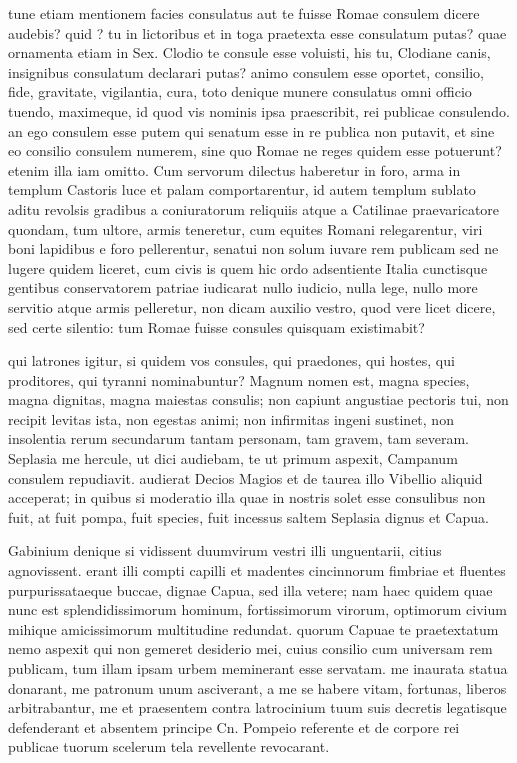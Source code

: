  tune etiam mentionem facies consulatus aut te fuisse Romae consulem dicere audebis? quid ? tu in lictoribus et in toga praetexta esse consulatum putas? quae ornamenta etiam in Sex. Clodio te consule esse voluisti, his tu, Clodiane canis, insignibus consulatum declarari putas? animo consulem esse oportet, consilio, fide, gravitate, vigilantia, cura, toto denique munere consulatus omni officio tuendo, maximeque, id quod vis nominis ipsa praescribit, rei publicae consulendo. an ego consulem esse putem qui senatum esse in re publica non putavit, et sine eo consilio consulem numerem, sine quo Romae ne reges quidem esse potuerunt? etenim illa iam omitto. Cum servorum dilectus haberetur in foro, arma in templum Castoris luce et palam comportarentur, id autem templum sublato aditu revolsis gradibus a coniuratorum reliquiis atque a Catilinae praevaricatore quondam, tum ultore, armis teneretur, cum equites Romani relegarentur, viri boni lapidibus e foro pellerentur, senatui non solum iuvare rem publicam sed ne lugere quidem liceret, cum civis is quem hic ordo adsentiente Italia cunctisque gentibus conservatorem patriae iudicarat nullo iudicio, nulla lege, nullo more servitio atque armis pelleretur, non dicam auxilio vestro, quod vere licet dicere, sed certe silentio: tum Romae fuisse consules quisquam existimabit?

 qui latrones igitur, si quidem vos consules, qui praedones, qui hostes, qui proditores, qui tyranni nominabuntur? Magnum nomen est, magna species, magna dignitas, magna maiestas consulis; non capiunt angustiae pectoris tui, non recipit levitas ista, non egestas animi; non infirmitas ingeni sustinet, non insolentia rerum secundarum tantam personam, tam gravem, tam severam. Seplasia me hercule, ut dici audiebam, te ut primum aspexit, Campanum consulem repudiavit. audierat Decios Magios et de taurea illo Vibellio aliquid acceperat; in quibus si moderatio illa quae in nostris solet esse consulibus non fuit, at fuit pompa, fuit species, fuit incessus saltem Seplasia dignus et Capua.

 Gabinium denique si vidissent duumvirum vestri illi unguentarii, citius agnovissent. erant illi compti capilli et madentes cincinnorum fimbriae et fluentes purpurissataeque buccae, dignae Capua, sed illa vetere; nam haec quidem quae nunc est splendidissimorum hominum, fortissimorum virorum, optimorum civium mihique amicissimorum multitudine redundat. quorum Capuae te praetextatum nemo aspexit qui non gemeret desiderio mei, cuius consilio cum universam rem publicam, tum illam ipsam urbem meminerant esse servatam. me inaurata statua donarant, me patronum unum asciverant, a me se habere vitam, fortunas, liberos arbitrabantur, me et praesentem contra latrocinium tuum suis decretis legatisque defenderant et absentem principe Cn. Pompeio referente et de corpore rei publicae tuorum scelerum tela revellente revocarant.

